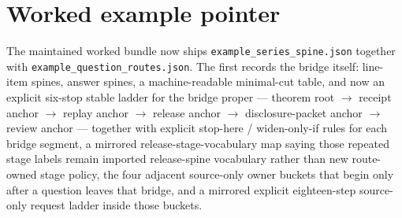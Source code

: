 \documentclass[11pt]{article}
\begin{document}
\section{Worked example pointer}
The maintained worked bundle now ships \nolinkurl{example_series_spine.json} together with \nolinkurl{example_question_routes.json}.\cite{series:workedexample}
The first records the bridge itself: line-item spines, answer spines, a machine-readable minimal-cut table, and now an explicit six-stop stable ladder for the bridge proper --- theorem root $\to$ receipt anchor $\to$ replay anchor $\to$ release anchor $\to$ disclosure-packet anchor $\to$ review anchor --- together with explicit stop-here / widen-only-if rules for each bridge segment, a mirrored release-stage-vocabulary map saying those repeated stage labels remain imported release-spine vocabulary rather than new route-owned stage policy, the four adjacent source-only owner buckets that begin only after a question leaves that bridge, and a mirrored explicit eighteen-step source-only request ladder inside those buckets.
\end{document}
